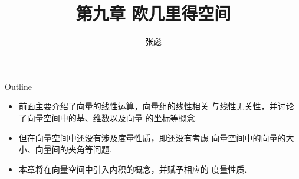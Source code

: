 \documentclass[13pt]{beamer}
\begin{document}

\title[]{第九章 \quad  欧几里得空间}
\author[]{{\large 张彪}\\  }

\date{}


\AtBeginSection[]
{
	\setcounter{exa}{0}
	\setcounter{equation}{0}
}


\begin{frame}
\maketitle
\end{frame}

\begin{frame}{Outline}
\tableofcontents
\end{frame}

\begin{frame}{}
\begin{itemize}
\item 前面主要介绍了向量的线性运算，向量组的线性相关 与线性无关性，并讨论了向量空间中的基、维数以及向量 的坐标等概念. 

\item 但在向量空间中还没有涉及度量性质，即还没有考虑 向量空间中的向量的大小、向量间的夹角等问题. 





\item 本章将在向量空间中引入内积的概念，并赋予相应的 度量性质. 

\end{itemize}

\end{frame}
\end{document}

